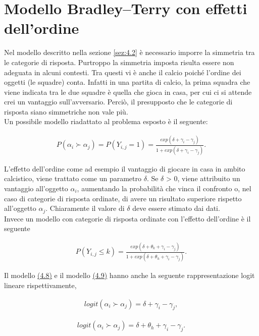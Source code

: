 \section{Modello Bradley–Terry con effetti dell'ordine} \label{sez:4.3}
Nel modello descritto nella sezione \ref{sez:4.2} è necessario imporre la simmetria tra le categorie di risposta. Purtroppo la simmetria imposta risulta essere non adeguata in alcuni contesti. Tra questi vi è anche il calcio poiché l'ordine dei oggetti (le squadre) conta. Infatti in una partita di calcio, la prima squadra che viene indicata tra le due squadre è quella che gioca in casa, per cui ci si attende crei un vantaggio sull'avversario. Perciò, il presupposto che le categorie di risposta siano simmetriche non vale più. \\
Un possibile modello riadattato al problema esposto è il seguente:

\begin{align} 
	P(\alpha_{i}\succ \alpha_{j}) = P(Y_{i,j} = 1) = \frac{exp(\delta + \gamma_{i} - \gamma_{j})}{1 + exp(\delta + \gamma_{i} - \gamma_{j})} \label{for:3.8}. 
\end{align}

L'effetto dell'ordine come ad esempio il vantaggio di giocare in casa in ambito calcistico, viene trattato come un parametro $\delta$. Se $\delta$ > 0, viene attribuito un vantaggio all'oggetto $\alpha_{i}$, aumentando la probabilità che vinca il confronto o, nel caso di categorie di risposta ordinate, di avere un risultato superiore rispetto all'oggetto $\alpha_{j}$. Chiaramente il valore di $\delta$ deve essere stimato dai dati.\\

Invece un modello con categorie di risposta ordinate con l'effetto dell'ordine è il seguente

\begin{align}
	P(Y_{i,j}\leq k) =  \frac{exp(\delta + \theta_{k} + \gamma_{i} - \gamma_{j})}{1 + exp(\delta + \theta_{h} + \gamma_{i} - \gamma_{j})} \label{for:3.9}.
\end{align}

Il modello \hyperref[for:3.8]{(4.8)} e il modello \hyperref[for:3.9]{(4.9)} hanno anche la seguente rappresentazione logit lineare rispettivamente,

\begin{align}
	logit(\alpha_{i} \succ \alpha_{j}) =  \delta + \gamma_i - \gamma_j,
\end{align}

\begin{align}
	logit(\alpha_{i} \succ \alpha_{j}) =  \delta + \theta_{h} + \gamma_i - \gamma_j.
\end{align}
	

